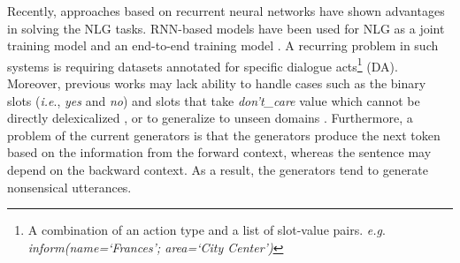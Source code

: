 \documentclass{llncs}
\begin{document}
Recently, approaches based on recurrent neural networks have shown advantages in solving the NLG tasks. RNN-based models have been used for NLG as a joint training model \cite{thwsjy15,wensclstm15} and an end-to-end training model \cite{wen2016network}. A recurring problem in such systems is requiring datasets annotated for specific dialogue acts\footnote{A combination of an action type and a list of slot-value pairs. \textit{e.g}. \textit{inform(name=`Frances'; area=`City Center')}} (DA). Moreover, previous works may lack ability to handle cases such as the binary slots (\textit{i.e}., \textit{yes} and \textit{no}) and slots that take \textit{don't\_care} value which cannot be directly delexicalized \cite{thwsjy15},  
or to generalize to unseen domains \cite{wensclstm15}. Furthermore, a problem of the current generators is that the generators produce the next token based on the information from the forward context, whereas the sentence may depend on the backward context. As a result, the generators tend to generate nonsensical utterances.
\end{document}
